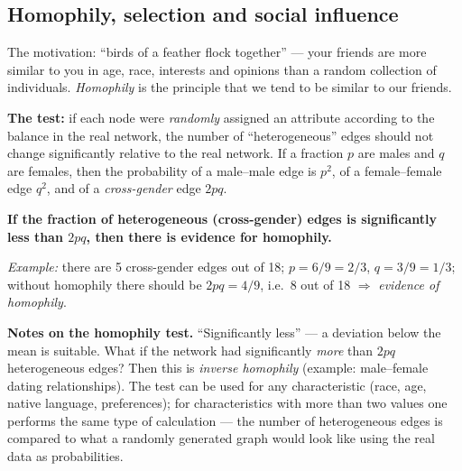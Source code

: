 \documentclass[11pt,a4paper]{article}
\theoremstyle{definition}
\providecommand{\uv}[1]{``#1''}
\begin{document}
\subsection{Homophily, selection and social influence}

\begin{defbox}
The motivation: \uv{birds of a feather flock together} --- your friends are more similar to you in
age, race, interests and opinions than a random collection of individuals. \emph{Homophily} is the
principle that we tend to be similar to our friends.

\textbf{The test:} if each node were \emph{randomly} assigned an attribute according to the balance
in the real network, the number of \uv{heterogeneous} edges should not change significantly relative
to the real network. If a fraction $p$ are males and $q$ are females, then the probability of a
male--male edge is $p^2$, of a female--female edge $q^2$, and of a \emph{cross-gender} edge $2pq$.

\textbf{If the fraction of heterogeneous (cross-gender) edges is significantly less than $2pq$, then
there is evidence for homophily.}

\emph{Example:} there are 5 cross-gender edges out of 18; $p=6/9=2/3$, $q=3/9=1/3$; without
homophily there should be $2pq=4/9$, i.e.\ 8 out of 18 $\Rightarrow$ \emph{evidence of homophily}.
\end{defbox}

\textbf{Notes on the homophily test.} \uv{Significantly less} --- a deviation below the mean is
suitable. What if the network had significantly \emph{more} than $2pq$ heterogeneous edges? Then this
is \emph{inverse homophily} (example: male--female dating relationships). The test can be used for any
characteristic (race, age, native language, preferences); for characteristics with more than two
values one performs the same type of calculation --- the number of heterogeneous edges is compared to
what a randomly generated graph would look like using the real data as probabilities.
\end{document}
